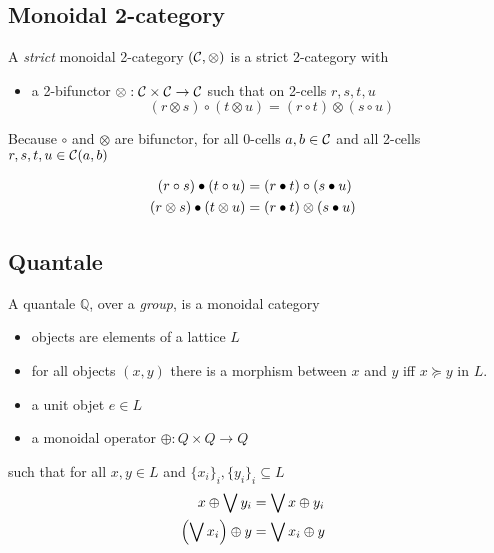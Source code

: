 \documentclass[a4paper]{article}
\begin{document}
\subsection{Monoidal 2-category}

A \emph{strict} monoidal 2-category $({\cal C}, \otimes)$ is a strict 2-category with

\begin{itemize}
\item a 2-bifunctor $\otimes: {\cal C} \times {\cal C} \to {\cal C}$ such that on 2-cells $r, s, t, u$
\[
(r \otimes s) \circ (t \otimes u) = (r \circ t) \otimes (s \circ u)
\]
\end{itemize}

\begin{remark}
Because $\circ$ and $\otimes$ are bifunctor, for all 0-cells $a, b \in {\cal C}$ and all 2-cells $r, s, t, u \in {\cal C}(a, b)$

\begin{align}
(r \circ s) \bullet (t \circ u) &= (r \bullet t) \circ (s \bullet u) \cr
(r \otimes s) \bullet (t \otimes u) &= (r \bullet t) \otimes (s \bullet u)
\end{align}
\end{remark}

\subsection{Quantale}

A quantale $\mathbb{Q}$, over a \emph{group}, is a monoidal category

\begin{itemize}
\item objects are elements of a lattice $L$
\item for all objects $(x, y)$ there is a morphism between $x$ and $y$ iff $x \succeq y$ in $L$.
\item a unit objet $e \in L$
\item a monoidal operator $\oplus: Q \times Q \to Q$
\end{itemize}

\noindent such that for all $x, y \in L$ and $\{x_i\}_i, \{y_i\}_i \subseteq L$
\begin{align}
x \oplus \bigvee y_i &= \bigvee x \oplus y_i \cr
\left(\bigvee x_i\right) \oplus y &= \bigvee x_i \oplus y
\end{align}
\end{document}
